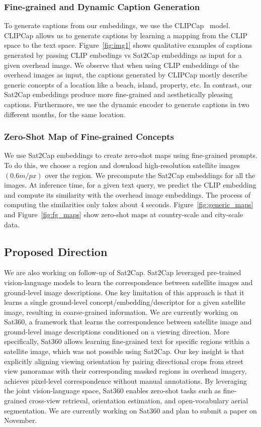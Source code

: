 \subsubsection{Fine-grained and Dynamic Caption Generation}
To generate captions from our embeddings, we use the CLIPCap~\cite{mokady2021clipcap} model. CLIPCap allows us to generate captions by learning a mapping from the CLIP space to the text space. Figure~\ref{fig:img1} shows qualitative examples of captions generated by passing CLIP embedings vs Sat2Cap embeddings as input for a given overhead image. We observe that when using CLIP embeddings of the overhead images as input, the captions generated by CLIPCap mostly describe generic concepts of a location like a beach, island, property, etc. In contrast, our Sat2Cap embeddings produce more fine-grained and aesthetically pleasing captions. Furthermore, we use the dynamic encoder to generate captions in two different months, for the same location.

\subsubsection{Zero-Shot Map of Fine-grained Concepts}
We use Sat2Cap embeddings to create zero-shot maps using fine-grained prompts. To do this, we choose a region and download high-resolution satellite images $(0.6m/px)$ over the region. We precompute the Sat2Cap embeddings for all the images. At inference time, for a given text query, we predict the CLIP embedding and compute its similarity with the overhead image embeddings. The process of computing the similarities only takes about 4 seconds. Figure~\ref{fig:generic_maps} and Figure~\ref{fig:fg_maps} show zero-shot maps at country-scale and city-scale data.

\subsection{Proposed Direction}
We are also working on follow-up of Sat2Cap. Sat2Cap leveraged pre-trained vision-language models to learn the correspondence between satellite images and ground-level image descriptions. One key limitation of this approach is that it learns a single ground-level concept/embedding/descriptor for a given satellite image, resulting in coarse-grained information. We are currently working on Sat360, a framework that learns the correspondence between satellite image and ground-level image descriptions conditioned on a viewing direction. More specifically, Sat360 allows learning fine-grained text for specific regions within a satellite image, which was not possible using Sat2Cap. Our key insight is that explicitly aligning viewing orientation by pairing directional crops from street view panoramas with their corresponding masked regions in overhead imagery, achieves pixel-level correspondence without manual annotations. By leveraging the joint vision-language space, Sat360 enables zero-shot tasks such as fine-grained cross-view retrieval, orientation estimation, and open-vocabulary aerial segmentation. We are currently working on Sat360 and plan to submit a paper on November. 

